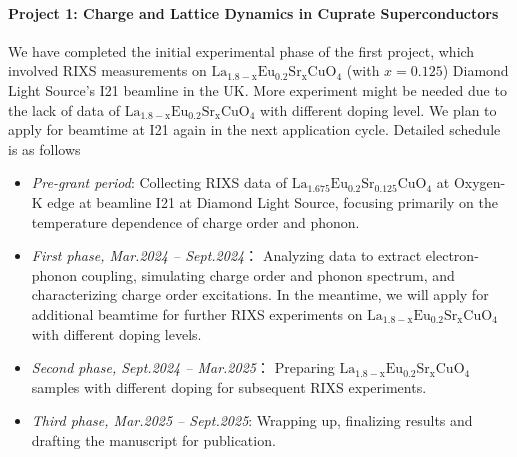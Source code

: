 \documentclass[11pt]{article}
\begin{document}
\paragraph{Project 1: Charge and Lattice Dynamics in Cuprate Superconductors}
We have completed the initial experimental phase of the first project, which involved RIXS measurements on $\mathrm{La_{1.8-x}Eu_{0.2}Sr_xCuO_{4}}$ (with $x=0.125$) Diamond Light Source's I21 beamline in the UK. More experiment might be needed due to the lack of data of $\mathrm{La_{1.8-x}Eu_{0.2}Sr_xCuO_{4}}$ with different doping level. We plan to apply for beamtime at I21 again in the next application cycle. Detailed schedule is as follows
\begin{itemize}
  \item \textit{Pre-grant period}: Collecting RIXS data of $\mathrm{La_{1.675}Eu_{0.2}Sr_{0.125}CuO_{4}}$ at Oxygen-K edge at beamline I21 at Diamond Light Source, focusing primarily on the temperature dependence of charge order and phonon. 
  \item \textit{First phase, Mar.2024 -- Sept.2024}： Analyzing data to extract electron-phonon coupling, simulating charge order and phonon spectrum, and characterizing charge order excitations. In the meantime, we will apply for additional beamtime for further RIXS experiments on $\mathrm{La_{1.8-x}Eu_{0.2}Sr_xCuO_{4}}$ with different doping levels. 
  \item \textit{Second phase, Sept.2024 -- Mar.2025}： Preparing $\mathrm{La_{1.8-x}Eu_{0.2}Sr_xCuO_{4}}$ samples with different doping for subsequent RIXS experiments. 
  \item \textit{Third phase, Mar.2025 -- Sept.2025}: Wrapping up,  finalizing results and drafting the manuscript for publication.
\end{itemize}
\end{document}
